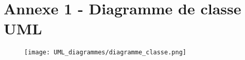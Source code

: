 \documentclass[11pt]{article}
\begin{document}





\appendix  %
\section*{Annexe 1 - Diagramme de classe UML}


\begin{figure}[H]
    \label{UML_classes}
    \centering
    \texttt{[image: UML\_diagrammes/diagramme\_classe.png]}
\end{figure}


\restoregeometry
\end{document}

